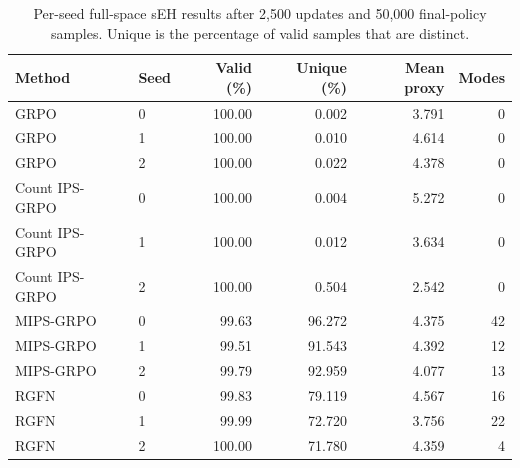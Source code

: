 \begin{table}[htbp]
\centering
\small
\caption{Per-seed full-space sEH results after 2,500 updates and 50,000
final-policy samples. Unique is the percentage of valid samples that are
distinct.}
\label{tab:molecule-per-seed}
\begin{tabular}{llrrrr}
\toprule
Method & Seed & Valid (\%) & Unique (\%) & Mean proxy & Modes \\
\midrule
GRPO & 0 & 100.00 & 0.002 & 3.791 & 0 \\
GRPO & 1 & 100.00 & 0.010 & 4.614 & 0 \\
GRPO & 2 & 100.00 & 0.022 & 4.378 & 0 \\
Count IPS-GRPO & 0 & 100.00 & 0.004 & 5.272 & 0 \\
Count IPS-GRPO & 1 & 100.00 & 0.012 & 3.634 & 0 \\
Count IPS-GRPO & 2 & 100.00 & 0.504 & 2.542 & 0 \\
MIPS-GRPO & 0 & 99.63 & 96.272 & 4.375 & 42 \\
MIPS-GRPO & 1 & 99.51 & 91.543 & 4.392 & 12 \\
MIPS-GRPO & 2 & 99.79 & 92.959 & 4.077 & 13 \\
RGFN & 0 & 99.83 & 79.119 & 4.567 & 16 \\
RGFN & 1 & 99.99 & 72.720 & 3.756 & 22 \\
RGFN & 2 & 100.00 & 71.780 & 4.359 & 4 \\
\bottomrule
\end{tabular}
\end{table}
